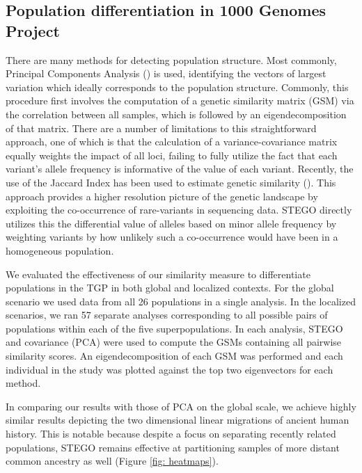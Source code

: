 \subsection{Population differentiation in 1000 Genomes Project}

There are many methods for detecting population structure. Most commonly,
Principal Components Analysis (\citealp{price2006principal,price2010new})
is used, identifying the vectors of largest variation which
ideally corresponds to the population structure. Commonly, this procedure first
involves the computation of a genetic similarity matrix (GSM) via
the correlation between all samples, which is followed by
an eigendecomposition of that matrix. There are a number of limitations
to this straightforward approach, one of which is that the calculation
of a variance-covariance matrix equally weights the impact of all
loci, failing to fully utilize the fact that each variant's allele frequency
is informative of the value of each variant. Recently, the use of
the Jaccard Index has been used to estimate genetic similarity (\citealp{prokopenko2016utilizing}).
This approach provides a higher resolution picture of the genetic
landscape by exploiting the co-occurrence of rare-variants in sequencing
data. STEGO directly utilizes this the differential value of alleles
based on minor allele frequency by weighting variants by how unlikely
such a co-occurrence would have been in a homogeneous population. 

We evaluated the effectiveness of our similarity measure to differentiate
populations in the TGP in both global and localized contexts. For
the global scenario we used data from all 26 populations in a single
analysis. In the localized scenarios, we ran 57 separate analyses
corresponding to all possible pairs of populations within each of
the five superpopulations. In each analysis, STEGO and covariance (PCA) were used to compute
the GSMs containing all pairwise similarity scores. An eigendecomposition
of each GSM was performed and each individual in the study was plotted
against the top two eigenvectors for each method. 

In comparing our results with those of PCA on the global scale, we achieve highly similar
results depicting the two dimensional linear migrations
of ancient human history. This is notable because despite a focus on separating recently
related populations, STEGO remains effective at partitioning samples of
more distant common ancestry as well (Figure \ref{fig: heatmaps}). 

